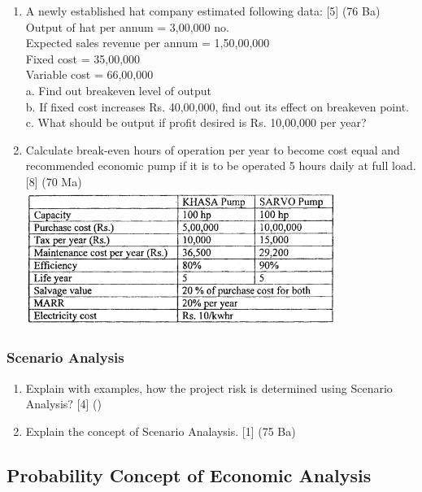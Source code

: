 \documentclass[12pt]{article}
\begin{document}
\begin{enumerate}
			\item A newly established hat company estimated following data: \hfill [5] (76 Ba)\\
			Output of hat per annum = 3,00,000 no.\\
			Expected sales revenue per annum = 1,50,00,000\\
			Fixed cost = 35,00,000\\
			Variable cost = 66,00,000\\[0pt]
			a. Find out breakeven level of output\\
			b. If fixed cost increases Rs. 40,00,000, find out its effect on breakeven point.\\
			c. What should be output if profit desired is Rs. 10,00,000 per year?

			\item Calculate break-even hours of operation per year to become cost equal and recommended economic pump if it is to be operated 5 hours daily at full load. \hfill [8] (70 Ma)\\
			\includegraphics[width=4in]{./pics/ee_5}
		\end{enumerate}

	\subsubsection{Scenario Analysis}
		\begin{enumerate}[noitemsep, topsep=0pt]
			\item Explain with examples, how the project risk is determined using Scenario Analysis? \hfill [4] ()

			\item Explain the concept of Scenario Analaysis. \hfill [1] (75 Ba)
		\end{enumerate}

	\subsection{Probability Concept of Economic Analysis}
\end{document}
